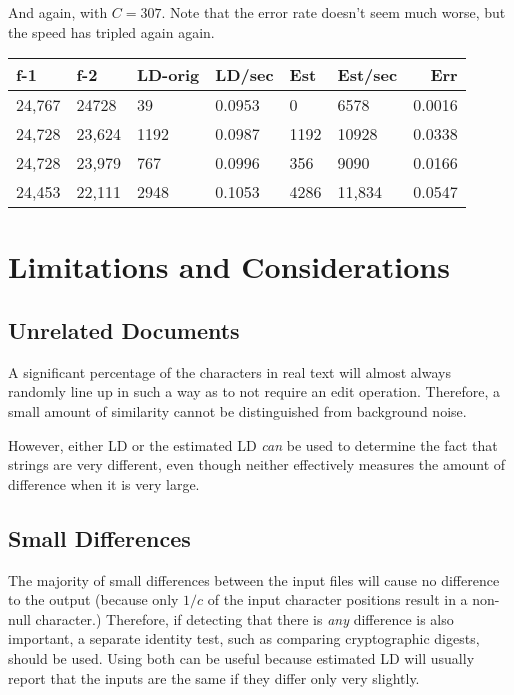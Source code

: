 \documentclass[html]{article}    %
\begin{document}
And again, with $C=307$.
Note that the error rate doesn't seem much worse, but the speed has tripled again again.

\vspace {10 mm}
\begin {tabular} {|l|l|l|l|l|l|r|} \hline \hline
 f-1  		& f-2 		& LD-orig	&LD/sec		& Est 		& Est/sec	 & Err  	\\ \hline
 \hline
 24,767 	& 24728  	& 39  		& 0.0953	& 0  	 	& 6578 	 	 & 0.0016 	\\ \hline
 24,728 	& 23,624  	& 1192  	& 0.0987	& 1192   	& 10928	 	 & 0.0338 	\\ \hline
 24,728 	& 23,979  	& 767  		& 0.0996	& 356   	& 9090 	 	 & 0.0166 	\\ \hline
 24,453 	& 22,111  	& 2948   	& 0.1053	& 4286   	& 11,834 	 & 0.0547 	\\ \hline
\end {tabular} 

\section{Limitations and Considerations}

\subsection{Unrelated Documents}

A significant percentage of the characters in real text will almost always randomly line up in such a way as to not require an 
edit operation.  Therefore, a small amount of similarity cannot be distinguished from background noise.

However, either LD or the estimated LD {\em can } be used to determine the fact that strings are very different, even though 
neither effectively measures the amount of difference when it is very large.

\subsection{Small Differences }

The majority of small differences between the input files will cause no difference to the output (because only $1/c$ of the input 
character positions result in a  non-null character.) 
Therefore, if detecting that there is {\em any} difference is also important, a separate identity test, such as comparing
cryptographic digests, should be used.
Using both can be useful because estimated LD will usually report that the inputs are the same if they differ only very slightly.
\end{document}
